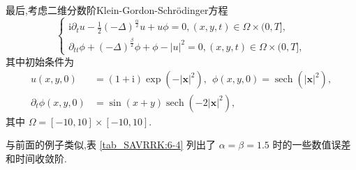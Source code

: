 \begin{example}\label{exp_SAVRRK:4}
\cite{fuStructurepreservingAlgorithmsTwodimensional2020} 
最后,考虑二维分数阶Klein-Gordon-Schr{\"o}dinger方程
\begin{equation}
\begin{cases}
\mathrm{i} \partial_t u-\frac{1}{2}(-\Delta)^{\frac{\alpha}{2}} u+u \phi=0,(x, y, t) \in \Omega \times(0, T],\\
\partial_{t t} \phi+(-\Delta)^{\frac{\beta}{2}} \phi+\phi-|u|^2=0, (x, y, t) \in \Omega \times(0, T],
\end{cases}
\end{equation}
其中初始条件为
\begin{equation}
	\begin{aligned}
		u(x, y, 0)&=(1+\mathrm{i}) \exp \left(-|\boldsymbol{x}|^2\right),~~\phi(x, y, 0)=\operatorname{sech}\left(|\boldsymbol{x}|^2\right),\\
		\partial_t \phi(x, y, 0)&=\sin (x+y) \operatorname{sech}\left(-2|\boldsymbol{x}|^2\right),
	\end{aligned}
\end{equation}
其中 $\Omega=[-10,10] \times[-10,10]$.
\end{example}

与前面的例子类似,表 \ref{tab_SAVRRK:6-4} 列出了 $\alpha=\beta=1.5$ 时的一些数值误差和时间收敛阶.


